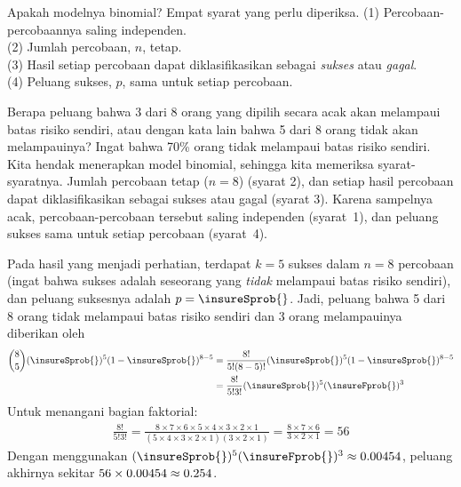 \begin{onebox}{Apakah modelnya binomial? Empat syarat yang perlu diperiksa.}
  \label{isItBinomialTipBox}%
  (1) Percobaan-percobaannya saling independen. \\
  (2) Jumlah percobaan, $n$, tetap. \\
  (3) Hasil setiap percobaan dapat diklasifikasikan sebagai
      \emph{sukses} atau \emph{gagal}. \\
  (4) Peluang sukses, $p$, sama untuk setiap percobaan.
\end{onebox}

\D{\newpage}

\begin{examplewrap}
\begin{nexample}{Berapa peluang bahwa 3 dari 8 orang yang dipilih secara
    acak akan melampaui batas risiko sendiri, atau dengan kata lain bahwa
    5 dari 8 orang tidak akan melampauinya? Ingat bahwa
    70\% orang tidak melampaui batas risiko sendiri.}
  Kita hendak menerapkan model binomial, sehingga kita memeriksa
  syarat-syaratnya. Jumlah percobaan tetap ($n=8$) (syarat 2), dan
  setiap hasil percobaan dapat diklasifikasikan sebagai sukses atau gagal
  (syarat 3). Karena sampelnya acak, percobaan-percobaan tersebut saling
  independen (syarat~1), dan peluang sukses sama untuk setiap percobaan
  (syarat~4).

  Pada hasil yang menjadi perhatian, terdapat $k=5$ sukses dalam $n=8$
  percobaan (ingat bahwa sukses adalah seseorang yang \emph{tidak}
  melampaui batas risiko sendiri), dan peluang suksesnya adalah
  $p=\insureSprob{}$. Jadi, peluang bahwa 5 dari 8 orang tidak melampaui
  batas risiko sendiri dan 3 orang melampauinya diberikan oleh
  \begin{align*}
  { 8 \choose 5}(\insureSprob{})^5
  (1-\insureSprob{})^{8-5}
    &= \frac{8!}{5!(8-5)!}
        (\insureSprob{})^5(1-\insureSprob{})^{8-5} \\
    &= \frac{8!}{5!3!}
        (\insureSprob{})^5(\insureFprob{})^3
  \end{align*}
  Untuk menangani bagian faktorial:
  \begin{align*}
  \frac{8!}{5!3!}
    = \frac{8\times7\times6\times5\times4\times3\times2\times1}
        {(5\times4\times3\times2\times1)(3\times2\times1)}
    = \frac{8\times7\times6}{3\times2\times1}
    = 56
  \end{align*}
  Dengan menggunakan $(\insureSprob{})^5(\insureFprob{})^3
    \approx \insureBinomEinHSingleScenario{}$,
  peluang akhirnya sekitar
  $56 \times 0.00454{}
    \approx 0.254{}$.
\end{nexample}
\end{examplewrap}

